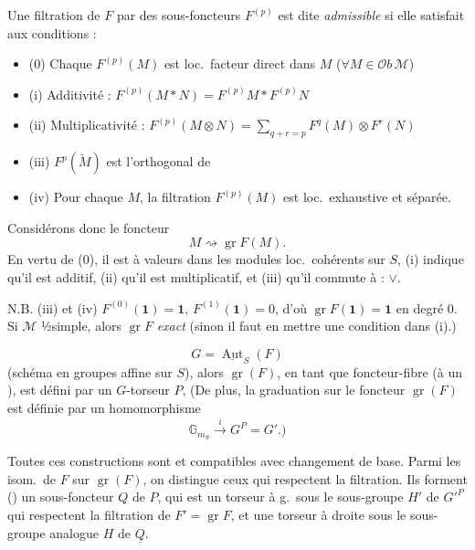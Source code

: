 \documentclass[11pt,a4paper]{article}
\begin{document}
Une filtration de $F$ par des sous-foncteurs $F^{(p)}$ est dite
\emph{admissible} si elle satisfait aux conditions :
\begin{itemize}
  \item (0) Chaque $F^{(p)}(M)$ est loc.\ facteur direct dans $M$
        ($\forall M \in \mathcal{O}b\,\mathcal{M}$)
  \item (i) Additivité : $F^{(p)}(M \ast N) = F^{(p)} M \ast F^{(p)} N$
  \item (ii) Multiplicativité :
        $F^{(p)}(M \otimes N) = \sum_{q + r = p} F^{q}(M) \otimes F^{r}(N)$
  \item (iii) $F^{p}(\check{M})$ est l'orthogonal de 
  \item (iv) Pour chaque $M$, la filtration $F^{(p)}(M)$ est loc.\ exhaustive
        et séparée.
\end{itemize}

Considérons donc le foncteur
\[
M \rightsquigarrow \operatorname{gr} F(M) .
\]
En vertu de (0), il est à valeurs dans les modules loc.\ cohérents
 sur $S$, (i) indique qu'il est additif, (ii)
qu'il est multiplicatif, et (iii) qu'il commute à : $\vee$.

N.B.  (iii) et (iv) 
$F^{(0)}(\mathbf{1}) = \mathbf{1}$, $F^{(1)}(\mathbf{1}) = 0$, d'où
$\operatorname{gr} F(\mathbf{1}) = \mathbf{1}$ \ill{} en degré $0$.
Si \struck{\ill{}} $\mathcal{M}$ ½simple, alors $\operatorname{gr} F$
\emph{exact} (sinon il faut en mettre une condition dans (i).)

\[
G = \underline{\operatorname{Aut}}_{S}(F)
\]
(schéma en groupes affine sur $S$), alors $\operatorname{gr}(F)$, en tant que
foncteur-fibre (à un  \ill{}), est défini par un
$G$-torseur $P$, 
(De plus, la graduation sur \struck{$\otimes$} le foncteur 
$\operatorname{gr}(F)$ est définie par un homomorphisme
\[
\mathbb{G}_{m_{S}} \xrightarrow{\;i\;} G^{P} = G' . )
\]

Toutes ces constructions sont  et compatibles avec
changement de base. Parmi les isom.\ de $F$ sur $\operatorname{gr}(F)$, on
distingue ceux  qui
respectent la filtration. Ils forment (\ill{}) un sous-foncteur $Q$ de $P$,
qui est un torseur à g.\ sous le sous-groupe $H'$ de $G'^{P}$
 qui respectent la
filtration  de $F' = \operatorname{gr} F$, et une torseur à
droite sous le sous-groupe analogue $H$ de $\underline{Q}$.
\end{document}
